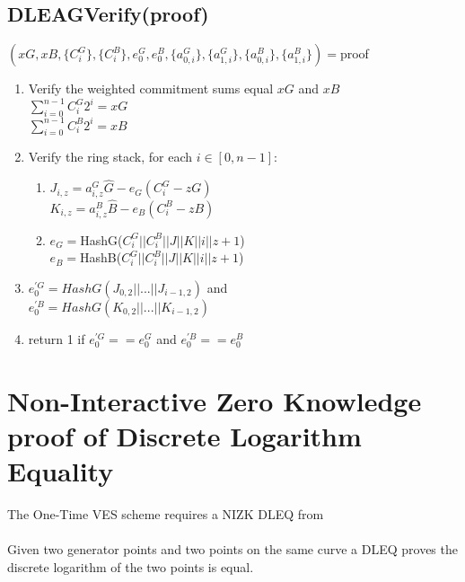 \documentclass[a4paper]{article}
\begin{document}
\subsection{DLEAGVerify(proof)}
$(xG, xB, \{C^{G}_{i}\}, \{C^{B}_{i}\}, e^{G}_{0}, e^{B}_{0}, \{a^{G}_{0, i}\}, \{a^{G}_{1, i}\}, \{a^{B}_{0, i}\}, \{a^{B}_{1, i}\}) = $proof
\begin{enumerate}
    \item Verify the weighted commitment sums equal $xG$ and $xB$\\
        $\sum_{i=0}^{n-1} C^{G}_{i}2^{i} = xG$\\
        $\sum_{i=0}^{n-1} C^{B}_{i}2^{i} = xB$
    \item Verify the ring stack, for each $i \in [0, n-1]$:
        \begin{enumerate}
            \item $J_{i,z} = a^{G}_{i,z}\hat{G} - e_{G}(C^{G}_{i} - zG)$\\
                  $K_{i,z} = a^{B}_{i,z}\hat{B} - e_{B}(C^{B}_{i} - zB)$
            \item $e_{G} = $HashG($C^{G}_{i}||C^{B}_{i}||J||K||i||z+1$)\\
                  $e_{B} = $HashB($C^{G}_{i}||C^{B}_{i}||J||K||i||z+1$)
        \end{enumerate}
    \item $e^{'G}_{0} = HashG(J_{0,2}||...||J_{i-1,2})$ and\\
        $e^{'B}_{0} = HashG(K_{0,2}||...||K_{i-1,2})$
    \item return 1 if $e^{'G}_{0} == e^{G}_{0}$ and $e^{'B}_{0} == e^{B}_{0}$
\end{enumerate}


\section{Non-Interactive Zero Knowledge proof of Discrete Logarithm Equality}
The One-Time VES scheme requires a NIZK DLEQ from \cite{dleq-proof}\\
\\
Given two generator points and two points on the same curve a DLEQ proves the discrete logarithm of the two points is equal.
\end{document}
